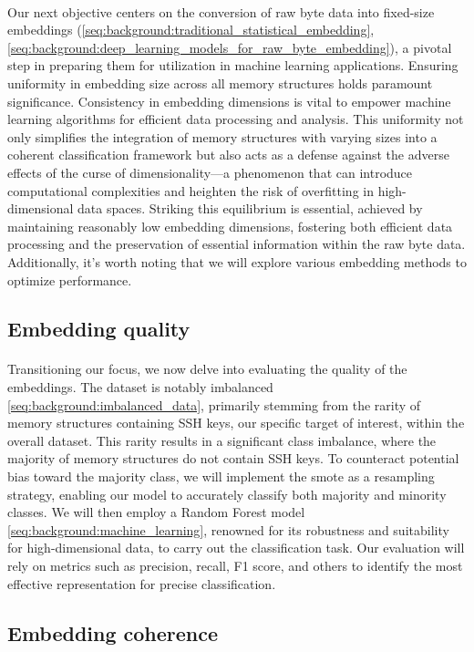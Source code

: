    \paragraph{}Our next objective centers on the conversion of raw byte data into fixed-size embeddings (\ref{seq:background:traditional_statistical_embedding}, \ref{seq:background:deep_learning_models_for_raw_byte_embedding}), a pivotal step in preparing them for utilization in machine learning applications. Ensuring uniformity in embedding size across all memory structures holds paramount significance. Consistency in embedding dimensions is vital to empower machine learning algorithms for efficient data processing and analysis. This uniformity not only simplifies the integration of memory structures with varying sizes into a coherent classification framework but also acts as a defense against the adverse effects of the curse of dimensionality—a phenomenon that can introduce computational complexities and heighten the risk of overfitting in high-dimensional data spaces. Striking this equilibrium is essential, achieved by maintaining reasonably low embedding dimensions, fostering both efficient data processing and the preservation of essential information within the raw byte data. Additionally, it's worth noting that we will explore various embedding methods to optimize performance.

    \subsection{Embedding quality}
    \paragraph{} Transitioning our focus, we now delve into evaluating the quality of the embeddings. The dataset is notably imbalanced \ref{seq:background:imbalanced_data}, primarily stemming from the rarity of memory structures containing SSH keys, our specific target of interest, within the overall dataset. This rarity results in a significant class imbalance, where the majority of memory structures do not contain SSH keys. To counteract potential bias toward the majority class, we will implement the \acrfull{smote} as a resampling strategy, enabling our model to accurately classify both majority and minority classes. We will then employ a Random Forest model \ref{seq:background:machine_learning}, renowned for its robustness and suitability for high-dimensional data, to carry out the classification task. Our evaluation will rely on metrics such as precision, recall, F1 score, and others to identify the most effective representation for precise classification.

    \subsection{Embedding coherence}